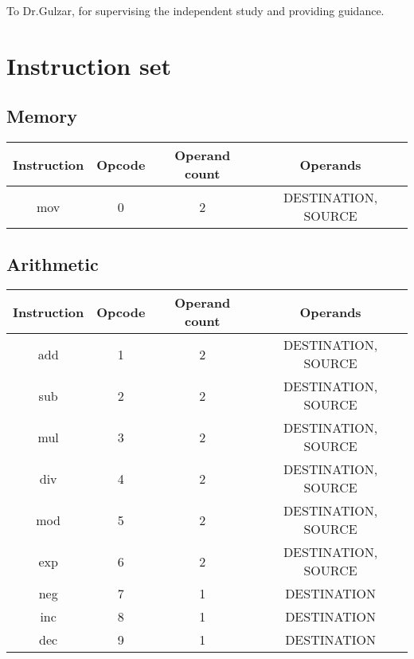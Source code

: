 \documentclass[manuscript,screen,nonacm]{acmart}
\begin{document}
\begin{acks}
To Dr.Gulzar, for supervising the independent study and providing guidance.
\end{acks}




\appendix

\section{Instruction set}
\subsection{Memory}
\begin{center}
\begin{tabular}{|c|c|c|c|}
    \hline
    Instruction & Opcode & Operand count & Operands \\
    \hline
    mov & 0 & 2 & DESTINATION, SOURCE \\
    \hline
\end{tabular}
\end{center}

\subsection{Arithmetic}
\begin{center}
\begin{tabular}{|c|c|c|c|}
    \hline
    Instruction & Opcode & Operand count & Operands \\
    \hline
    add & 1 & 2 & DESTINATION, SOURCE \\
    sub & 2 & 2 & DESTINATION, SOURCE \\
    mul & 3 & 2 & DESTINATION, SOURCE \\
    div & 4 & 2 & DESTINATION, SOURCE \\
    mod & 5 & 2 & DESTINATION, SOURCE \\
    exp & 6 & 2 & DESTINATION, SOURCE \\
    neg & 7 & 1 & DESTINATION \\
    inc & 8 & 1 & DESTINATION \\
    dec & 9 & 1 & DESTINATION \\
    \hline
\end{tabular}
\end{center}
\end{document}
